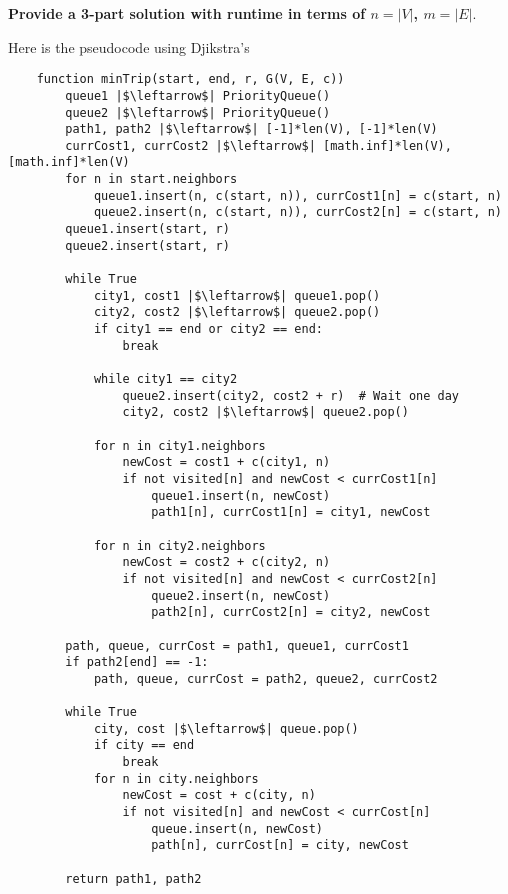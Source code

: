 \documentclass{article}
\begin{document}
\textbf{Provide a 3-part solution with runtime in terms of $n = \lvert V \rvert$, $m = \lvert E \rvert$}.
    \begin{answer}
        Here is the pseudocode using Djikstra's
        \begin{verbatim}
    function minTrip(start, end, r, G(V, E, c))
        queue1 |$\leftarrow$| PriorityQueue()
        queue2 |$\leftarrow$| PriorityQueue()
        path1, path2 |$\leftarrow$| [-1]*len(V), [-1]*len(V)
        currCost1, currCost2 |$\leftarrow$| [math.inf]*len(V), [math.inf]*len(V)
        for n in start.neighbors
            queue1.insert(n, c(start, n)), currCost1[n] = c(start, n)
            queue2.insert(n, c(start, n)), currCost2[n] = c(start, n)
        queue1.insert(start, r)
        queue2.insert(start, r)

        while True
            city1, cost1 |$\leftarrow$| queue1.pop()
            city2, cost2 |$\leftarrow$| queue2.pop()
            if city1 == end or city2 == end:
                break

            while city1 == city2
                queue2.insert(city2, cost2 + r)  # Wait one day
                city2, cost2 |$\leftarrow$| queue2.pop()

            for n in city1.neighbors
                newCost = cost1 + c(city1, n)
                if not visited[n] and newCost < currCost1[n]
                    queue1.insert(n, newCost)
                    path1[n], currCost1[n] = city1, newCost

            for n in city2.neighbors
                newCost = cost2 + c(city2, n)
                if not visited[n] and newCost < currCost2[n]
                    queue2.insert(n, newCost)
                    path2[n], currCost2[n] = city2, newCost

        path, queue, currCost = path1, queue1, currCost1
        if path2[end] == -1:
            path, queue, currCost = path2, queue2, currCost2

        while True
            city, cost |$\leftarrow$| queue.pop()
            if city == end
                break
            for n in city.neighbors
                newCost = cost + c(city, n)
                if not visited[n] and newCost < currCost[n]
                    queue.insert(n, newCost)
                    path[n], currCost[n] = city, newCost

        return path1, path2
        \end{verbatim}


\end{answer}
\end{document}

